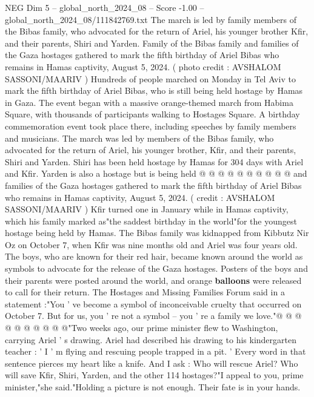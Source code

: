 \begin{textsample}{NEG Dim 5 – global\_north\_2024\_08 – Score -1.00 – global\_north\_2024\_08/111842769.txt}  \label{ex:f5_neg_069}
The march is led by family members of the Bibas family, who advocated for the return of Ariel, his younger brother Kfir, and their parents, Shiri and Yarden.
Family of the Bibas family and families of the Gaza hostages gathered to mark the fifth birthday of Ariel Bibas who remains in Hamas captivity, August 5, 2024. ( photo credit : AVSHALOM SASSONI/MAARIV ) Hundreds of people marched on Monday in Tel Aviv to mark the fifth birthday of Ariel Bibas, who is still being held hostage by Hamas in Gaza.
The event began with a massive orange-themed march from Habima Square, with thousands of participants walking to Hostages Square.
A birthday commemoration event took place there, including speeches by family members and musicians.
The march was led by members of the Bibas family, who advocated for the return of Ariel, his younger brother, Kfir, and their parents, Shiri and Yarden.
Shiri has been held hostage by Hamas for 304 days with Ariel and Kfir.
Yarden is also a hostage but is being held @ @ @ @ @ @ @ @ @ @ and families of the Gaza hostages gathered to mark the fifth birthday of Ariel Bibas who remains in Hamas captivity, August 5, 2024. ( credit : AVSHALOM SASSONI/MAARIV ) Kfir turned one in January while in Hamas captivity, which his family marked as"the saddest birthday in the world"for the youngest hostage being held by Hamas.
The Bibas family was kidnapped from Kibbutz Nir Oz on October 7, when Kfir was nine months old and Ariel was four years old.
The boys, who are known for their red hair, became known around the world as symbols to advocate for the release of the Gaza hostages.
Posters of the boys and their parents were posted around the world, and orange \textbf{balloons} were released to call for their return.
The Hostages and Missing Families Forum said in a statement :"You ' ve become a symbol of inconceivable cruelty that occurred on October 7.
But for us, you ' re not a symbol -- you ' re a family we love."@ @ @ @ @ @ @ @ @ @"Two weeks ago, our prime minister flew to Washington, carrying Ariel ' s drawing.
Ariel had described his drawing to his kindergarten teacher : ' I ' m flying and rescuing people trapped in a pit. ' Every word in that sentence pierces my heart like a knife.
And I ask : Who will rescue Ariel?
Who will save Kfir, Shiri, Yarden, and the other 114 hostages?"I appeal to you, prime minister,"she said."Holding a picture is not enough.
Their fate is in your hands.

\end{textsample}
